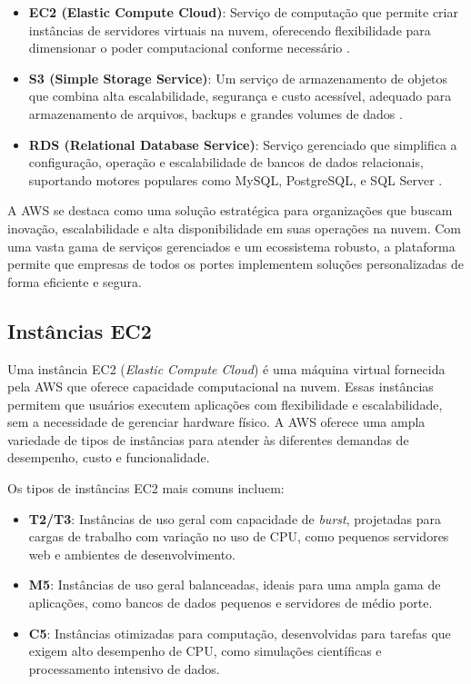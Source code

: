 \begin{itemize}
    \item \textbf{EC2 (Elastic Compute Cloud)}: Serviço de computação que permite criar instâncias de servidores virtuais na nuvem, oferecendo flexibilidade para dimensionar o poder computacional conforme necessário \cite{aws-ec2}.
    \item \textbf{S3 (Simple Storage Service)}: Um serviço de armazenamento de objetos que combina alta escalabilidade, segurança e custo acessível, adequado para armazenamento de arquivos, backups e grandes volumes de dados \cite{aws-s3}.
    \item \textbf{RDS (Relational Database Service)}: Serviço gerenciado que simplifica a configuração, operação e escalabilidade de bancos de dados relacionais, suportando motores populares como MySQL, PostgreSQL, e SQL Server \cite{aws-rds}.
\end{itemize}

A AWS se destaca como uma solução estratégica para organizações que buscam inovação, escalabilidade e alta disponibilidade em suas operações na nuvem. Com uma vasta gama de serviços gerenciados e um ecossistema robusto, a plataforma permite que empresas de todos os portes implementem soluções personalizadas de forma eficiente e segura.

\subsection{Instâncias EC2}


Uma instância EC2 (\emph{Elastic Compute Cloud}) é uma máquina virtual fornecida pela AWS que oferece capacidade computacional na nuvem. Essas instâncias permitem que usuários executem aplicações com flexibilidade e escalabilidade, sem a necessidade de gerenciar hardware físico. A AWS oferece uma ampla variedade de tipos de instâncias para atender às diferentes demandas de desempenho, custo e funcionalidade.

Os tipos de instâncias EC2 mais comuns incluem:

\begin{itemize}
    \item \textbf{T2/T3}: Instâncias de uso geral com capacidade de \emph{burst}, projetadas para cargas de trabalho com variação no uso de CPU, como pequenos servidores web e ambientes de desenvolvimento.
    \item \textbf{M5}: Instâncias de uso geral balanceadas, ideais para uma ampla gama de aplicações, como bancos de dados pequenos e servidores de médio porte.
    \item \textbf{C5}: Instâncias otimizadas para computação, desenvolvidas para tarefas que exigem alto desempenho de CPU, como simulações científicas e processamento intensivo de dados.
\end{itemize}

